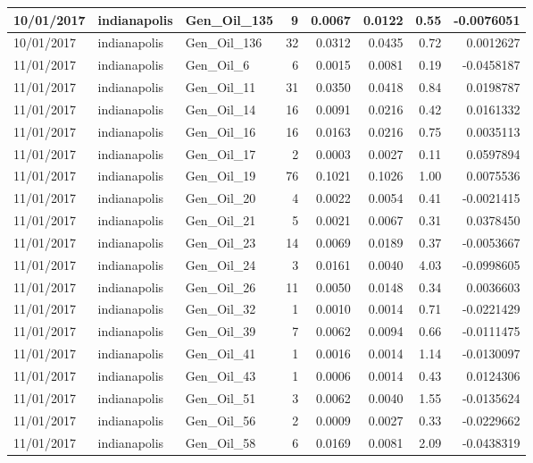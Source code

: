 \documentclass[
  letterpaper,
  DIV=11,
  numbers=noendperiod]{scrartcl}
\begin{document}
\begin{tabular}{l|l|l|r|r|r|r|r}
\hline
10/01/2017 & indianapolis & Gen\_Oil\_135 & 9 & 0.0067 & 0.0122 & 0.55 & -0.0076051\\
\hline
10/01/2017 & indianapolis & Gen\_Oil\_136 & 32 & 0.0312 & 0.0435 & 0.72 & 0.0012627\\
\hline
11/01/2017 & indianapolis & Gen\_Oil\_6 & 6 & 0.0015 & 0.0081 & 0.19 & -0.0458187\\
\hline
11/01/2017 & indianapolis & Gen\_Oil\_11 & 31 & 0.0350 & 0.0418 & 0.84 & 0.0198787\\
\hline
11/01/2017 & indianapolis & Gen\_Oil\_14 & 16 & 0.0091 & 0.0216 & 0.42 & 0.0161332\\
\hline
11/01/2017 & indianapolis & Gen\_Oil\_16 & 16 & 0.0163 & 0.0216 & 0.75 & 0.0035113\\
\hline
11/01/2017 & indianapolis & Gen\_Oil\_17 & 2 & 0.0003 & 0.0027 & 0.11 & 0.0597894\\
\hline
11/01/2017 & indianapolis & Gen\_Oil\_19 & 76 & 0.1021 & 0.1026 & 1.00 & 0.0075536\\
\hline
11/01/2017 & indianapolis & Gen\_Oil\_20 & 4 & 0.0022 & 0.0054 & 0.41 & -0.0021415\\
\hline
11/01/2017 & indianapolis & Gen\_Oil\_21 & 5 & 0.0021 & 0.0067 & 0.31 & 0.0378450\\
\hline
11/01/2017 & indianapolis & Gen\_Oil\_23 & 14 & 0.0069 & 0.0189 & 0.37 & -0.0053667\\
\hline
11/01/2017 & indianapolis & Gen\_Oil\_24 & 3 & 0.0161 & 0.0040 & 4.03 & -0.0998605\\
\hline
11/01/2017 & indianapolis & Gen\_Oil\_26 & 11 & 0.0050 & 0.0148 & 0.34 & 0.0036603\\
\hline
11/01/2017 & indianapolis & Gen\_Oil\_32 & 1 & 0.0010 & 0.0014 & 0.71 & -0.0221429\\
\hline
11/01/2017 & indianapolis & Gen\_Oil\_39 & 7 & 0.0062 & 0.0094 & 0.66 & -0.0111475\\
\hline
11/01/2017 & indianapolis & Gen\_Oil\_41 & 1 & 0.0016 & 0.0014 & 1.14 & -0.0130097\\
\hline
11/01/2017 & indianapolis & Gen\_Oil\_43 & 1 & 0.0006 & 0.0014 & 0.43 & 0.0124306\\
\hline
11/01/2017 & indianapolis & Gen\_Oil\_51 & 3 & 0.0062 & 0.0040 & 1.55 & -0.0135624\\
\hline
11/01/2017 & indianapolis & Gen\_Oil\_56 & 2 & 0.0009 & 0.0027 & 0.33 & -0.0229662\\
\hline
11/01/2017 & indianapolis & Gen\_Oil\_58 & 6 & 0.0169 & 0.0081 & 2.09 & -0.0438319\\

\end{tabular}
\end{document}
